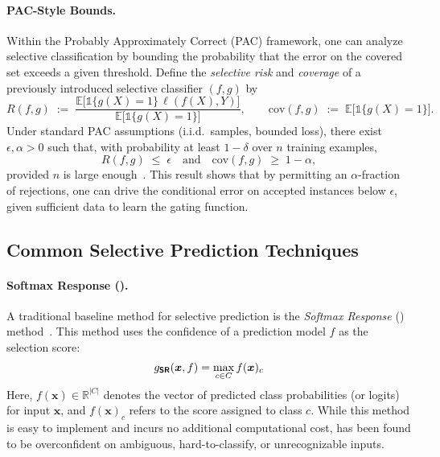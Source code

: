 \paragraph{PAC-Style Bounds.}
Within the Probably Approximately Correct (PAC) framework, one can analyze selective classification by bounding the probability that the error on the covered set exceeds a given threshold. Define the \emph{selective risk} and \emph{coverage} of a previously introduced selective classifier $(f,g)$ by
\[
    R(f,g)
    \;:=\;
    \frac{\mathbb{E}\bigl[\mathds{1}\{g(X)=1\}\,\ell(f(X),Y)\bigr]}
         {\mathbb{E}\bigl[\mathds{1}\{g(X)=1\}\bigr]}
    ,\qquad
    \text{cov}(f,g)
    \;:=\;
    \mathbb{E}\bigl[\mathds{1}\{g(X)=1\}\bigr].
\]
Under standard PAC assumptions (i.i.d.\ samples, bounded loss), there exist $\epsilon,\alpha>0$ such that, with probability at least $1-\delta$ over $n$ training examples,
\begin{equation}
    R(f,g)\;\le\;\epsilon
    \quad\text{and}\quad
    \text{cov}(f,g)\;\ge\;1-\alpha,
    \label{eq:pac_selective}
\end{equation}
provided $n$ is large enough~\citep{cortes2016learning}.  
This result shows that by permitting an $\alpha$-fraction of rejections, one can drive the conditional error on accepted instances below $\epsilon$, given sufficient data to learn the gating function.



\subsection{Common Selective Prediction Techniques}

\paragraph{Softmax Response (\sr).} A traditional baseline method for selective prediction is the \emph{Softmax Response} (\sr) method~\citep{hendrycks2016baseline, geifman2017selective}. This method uses the confidence of a prediction model \(f\) as the selection score:
\begin{equation}
	g_{\textbf{\sffamily SR}}(\bm{x}, f) = \max_{c \in C} f(\bm{x})_c
\end{equation}
Here, \(f(\bm{x}) \in \mathbb{R}^{|C|}\) denotes the vector of predicted class probabilities (or logits) for input \(\bm{x}\), and \(f(\bm{x})_c\) refers to the score assigned to class \(c\). While this method is easy to implement and incurs no additional computational cost, \sr has been found to be overconfident on ambiguous, hard-to-classify, or unrecognizable inputs.

